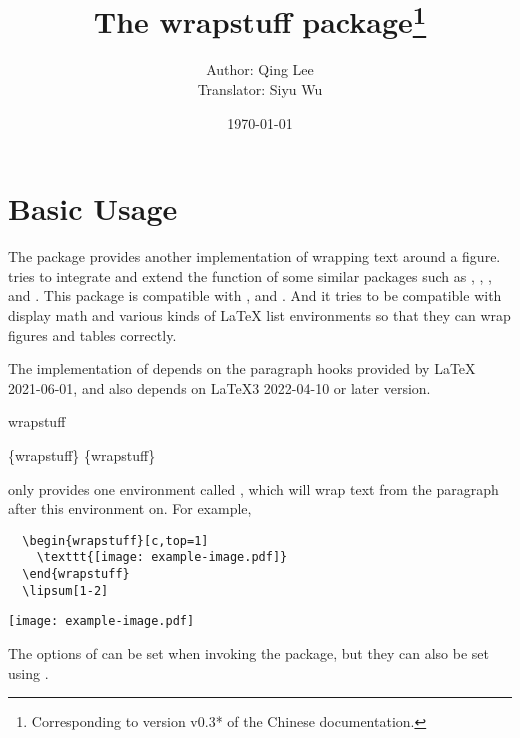 \documentclass{l3doc}
\title{The \textsf{wrapstuff} package\thanks{Corresponding to version v0.3*
  of the Chinese documentation.}}
\author{Author: Qing Lee \\ Translator: Siyu Wu}
\date{\today}
\begin{document}
\maketitle

\section{Basic Usage}

The  package provides another implementation
of wrapping text around a figure.
 tries to integrate and extend the function
of some similar packages such as , ,
,  and .
This package is compatible with , 
and . And it tries to be compatible with display
math and various kinds of \LaTeX{} list environments so that
they can wrap figures and tables correctly.

The implementation of  depends on the paragraph
hooks provided by \LaTeX{} 2021-06-01, and also depends on
\LaTeX3 2022-04-10 or later version.

\begin{function}{wrapstuff}
  \begin{syntax}
    \{wrapstuff\}
    \{wrapstuff\}
  \end{syntax}
\end{function}

 only provides one environment called ,
which will wrap text from the paragraph after this environment on.
For example,

\begin{verbatim}
  \begin{wrapstuff}[c,top=1]
    \texttt{[image: example-image.pdf]}
  \end{wrapstuff}
  \lipsum[1-2]
\end{verbatim}

\begin{wrapstuff}[c,top=1]
  \texttt{[image: example-image.pdf]}
\end{wrapstuff}
\lipsum[1]

\begin{function}{\wrapstuffset}
  \begin{syntax}
  \end{syntax}
  The options of  can be set when invoking the package,
  but they can also be set using .
\end{function}
\end{document}
